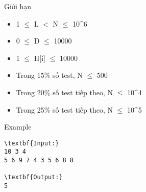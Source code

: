 Giới hạn
\begin{itemize}
	\item 1  $\le$  L $<$ N  $\le$  10^6
	\item 0  $\le$  D  $\le$  10000
	\item 1  $\le$  H[i]  $\le$  10000
	\item Trong 15\% số test, N  $\le$  500
	\item Trong 20\% số test tiếp theo, N  $\le$  10^4
	\item Trong 25\% số test tiếp theo, N  $\le$  10^5
\end{itemize}
Example
\begin{verbatim}
\textbf{Input:}
10 3 4
5 6 9 7 4 3 5 6 8 8

\textbf{Output:}
5\end{verbatim}